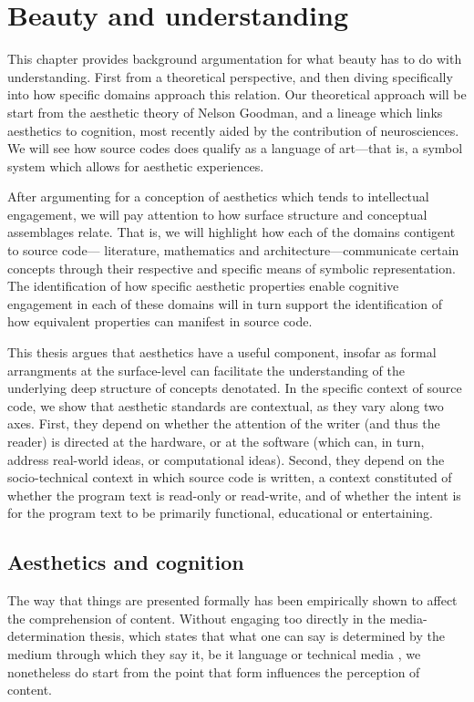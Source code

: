 \chapter{Beauty and understanding}
\label{chap:beauty}

This chapter provides background argumentation for what beauty has to do with understanding. First from a theoretical perspective, and then diving specifically into how specific domains approach this relation. Our theoretical approach will be start from the aesthetic theory of Nelson Goodman, and a lineage which links aesthetics to cognition, most recently aided by the contribution of neurosciences. We will see how source codes does qualify as a language of art—that is, a symbol system which allows for aesthetic experiences.

After argumenting for a conception of aesthetics which tends to intellectual engagement, we will pay attention to how surface structure and conceptual assemblages relate. That is, we will highlight how each of the domains contigent to source code— literature, mathematics and architecture—communicate certain concepts through their respective and specific means of symbolic representation. The identification of how specific aesthetic properties enable cognitive engagement in each of these domains will in turn support the identification of how equivalent properties can manifest in source code.

This thesis argues that aesthetics have a useful component, insofar as formal arrangments at the surface-level can facilitate the understanding of the underlying deep structure of concepts denotated. In the specific context of source code, we show that aesthetic standards are contextual, as they vary along two axes. First, they depend on whether the attention of the writer (and thus the reader) is directed at the hardware, or at the software (which can, in turn, address real-world ideas, or computational ideas). Second, they depend on the socio-technical context in which source code is written, a context constituted of whether the program text is read-only or read-write, and of whether the intent is for the program text to be primarily functional, educational or entertaining.

\section{Aesthetics and cognition}
\label{sec:aesthetic-cognition}

The way that things are presented formally has been empirically shown to affect the comprehension of content. Without engaging too directly in the media-determination thesis, which states that what one can say is determined by the medium through which they say it, be it language or technical media \citep{postman_amusing_1985}, we nonetheless do start from the point that form influences the perception of content.

